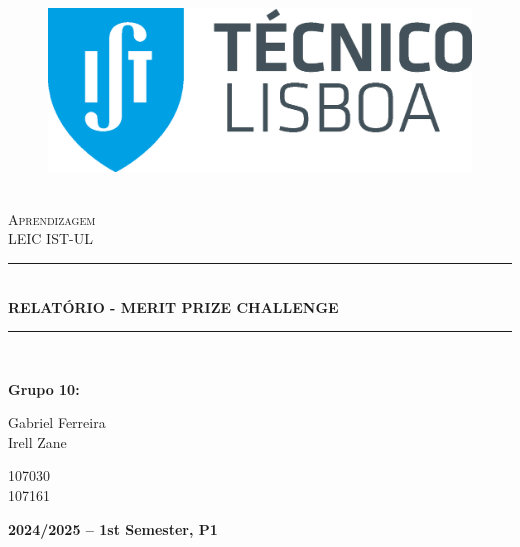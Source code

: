 \documentclass[11pt]{article}
\newcommand{\HRule}[1]{\rule{\linewidth}{#1}}
\begin{document}
\begin{center}
  \begin{figure}
    \includegraphics[scale = 0.3, left]{img/IST_A.eps} %
    \end{figure}
  \LARGE{ \normalsize \textsc{} \\
  [2.0cm] 
  \LARGE{ \LARGE \textsc{Aprendizagem}} \\
  [1cm]
  \LARGE{ \LARGE \textsc{LEIC IST-UL}} \\
  [1cm]
  \HRule{1.5pt} \\
  [0.4cm]
  \LARGE \textbf{\uppercase{Relatório - Merit Prize Challenge}}
  \HRule{1.5pt}
  \\ [2.5cm]
  }
\end{center}

\begin{flushleft}
  \textbf{\LARGE Grupo 10:}
\end{flushleft}

\begin{center}
  \begin{minipage}{0.7\textwidth}
      \begin{flushleft}
        \large Gabriel Ferreira \\
        \large  Irell Zane
      \end{flushleft}
  \end{minipage}%
  \begin{minipage}{0.3\textwidth}
      \begin{flushright}
        \large 107030\\
        \large 107161
      \end{flushright}
  \end{minipage}
\end{center}

\hfill

\begin{center}
  \vspace{4cm}
  \date \large \bf  2024/2025 -- 1st Semester, P1
\end{center}
\end{document}
